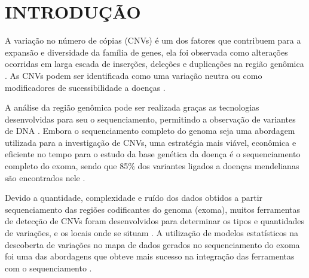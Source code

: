 
\chapter{INTRODUÇÃO}
\label{chap:introducao}


A variação no número de cópias (CNVs) é um dos fatores que contribuem para a expansão e diversidade da família de genes, ela foi observada como alterações ocorridas em larga escada de inserções, deleções e duplicações na região genômica \cite{Perry2009,Zhao2013,Redon2006,Costain2016}. 
As CNVs podem ser identificada como uma variação neutra ou como modificadores de sucessibilidade a doenças \cite{Costain2016,Perry2009}.

A análise da região genômica pode ser realizada graças as tecnologias desenvolvidas para seu o sequenciamento, permitindo a observação de variantes de DNA \cite{Sathirapongsasuti2011}. Embora o sequenciamento completo do genoma seja uma abordagem utilizada para a investigação de CNVs, uma estratégia mais viável, econômica e eficiente no tempo para o estudo da base genética da doença é o sequenciamento completo do exoma, sendo que 85\% dos variantes ligados a doenças mendelianas são encontrados nele \cite{Chong2015,Sathirapongsasuti2011,Fromer2012}.

Devido a quantidade, complexidade e ruído dos dados obtidos a partir sequenciamento das regiões codificantes do genoma (exoma), muitos ferramentas de detecção de CNVs foram desenvolvidos para determinar os tipos e quantidades de variações, e os locais onde se situam \cite{Fromer2012,Tan2014}. A utilização de modelos estatísticos na descoberta de variações no mapa de dados gerados no sequenciamento do exoma foi uma das abordagens que obteve mais sucesso na integração das ferramentas com o sequenciamento \cite{Tan2014}.







